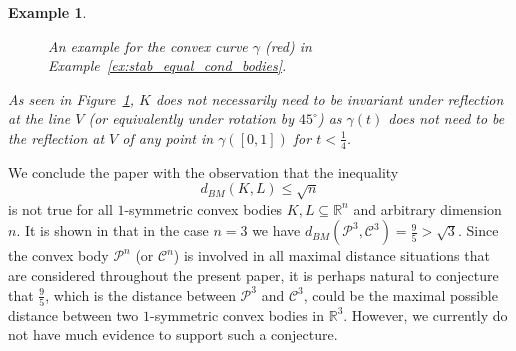 \documentclass[12pt,a4paper]{article}
\newtheorem{exam}[twr]{Example}
\theoremstyle{definition}
\newcommand\R{\mathbb{R}}
\newcommand\CC{\mathcal{C}}
\newcommand\CP{\mathcal{P}}
\def\ds{1.5/\scale pt}
\begin{document}
\begin{exam}
\begin{figure}[ht]
%
\caption{
An example for the convex curve $\gamma$ (red) in Example~\ref{ex:stab_equal_cond_bodies}.
}
\label{fig:non-symmetric_example_1-symm}
\end{figure}



As seen in Figure~\ref{fig:non-symmetric_example_1-symm}, $K$ does not necessarily need to be invariant under reflection at the line $V$ (or equivalently under rotation by $45^\circ$) as $\gamma(t)$ does not need to be the reflection at $V$ of any point in $\gamma([0,1])$ for $t<\frac{1}{4}$.
\end{exam}
\newpage



We conclude the paper with the observation that the inequality
$$d_{BM}(K,L) \leq \sqrt{n}$$
is not true for all $1$-symmetric convex bodies $K,L \subseteq \R^n$ and arbitrary dimension $n$. It is shown in \cite{kobosvarivoda} that in the case $n = 3$ we have $d_{BM}(\CP^3, \CC^3) = \frac{9}{5} > \sqrt{3}$. Since the convex body $\CP^n$ (or $\CC^n$) is involved in all maximal distance situations that are considered throughout the present paper, it is perhaps natural to conjecture that $\frac{9}{5}$, which is the distance between $\CP^3$ and $\CC^3$, could be the maximal possible distance between two $1$-symmetric convex bodies in $\R^3$. However, we currently do not have much evidence to support such a conjecture.
\end{document}
